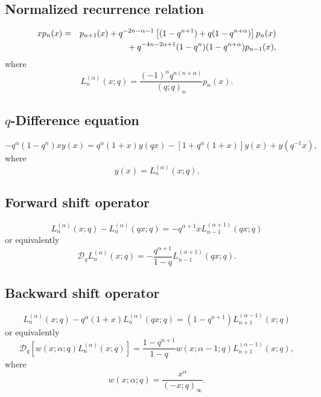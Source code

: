\documentclass[envcountchap,graybox]{svmono}
\newcommand{\mathindent}{\hspace{7.5mm}}
\begin{document}
{{\subsection*{Normalized recurrence relation}
\begin{eqnarray}
\label{NormRecqLaguerre}
xp_n(x)&=&p_{n+1}(x)+q^{-2n-\alpha-1}\left[(1-q^{n+1})+q(1-q^{n+\alpha})\right]p_n(x)\nonumber\\
& &{}\mathindent{}+q^{-4n-2\alpha+1}(1-q^n)(1-q^{n+\alpha})p_{n-1}(x),
\end{eqnarray}
where
$$L_n^{(\alpha)}(x;q)=\frac{(-1)^nq^{n(n+\alpha)}}{(q;q)_n}p_n(x).$$

\subsection*{$q$-Difference equation}
\begin{equation}
\label{dvqLaguerre}
-q^{\alpha}(1-q^n)xy(x)=q^{\alpha}(1+x)y(qx)-\left[1+q^{\alpha}(1+x)\right]y(x)+y(q^{-1}x),
\end{equation}
where
$$y(x)=L_n^{(\alpha)}(x;q).$$

\subsection*{Forward shift operator}
\begin{equation}
\label{shift1qLaguerreI}
L_n^{(\alpha)}(x;q)-L_n^{(\alpha)}(qx;q)=-q^{\alpha+1}xL_{n-1}^{(\alpha+1)}(qx;q)
\end{equation}
or equivalently
\begin{equation}
\label{shift1qLaguerreII}
\mathcal{D}_qL_n^{(\alpha)}(x;q)=-\frac{q^{\alpha+1}}{1-q}L_{n-1}^{(\alpha+1)}(qx;q).
\end{equation}

\subsection*{Backward shift operator}
\begin{equation}
\label{shift2qLaguerreI}
L_n^{(\alpha)}(x;q)-q^{\alpha}(1+x)L_n^{(\alpha)}(qx;q)=(1-q^{n+1})L_{n+1}^{(\alpha-1)}(x;q)
\end{equation}
or equivalently
\begin{equation}
\label{shift2qLaguerreII}
\mathcal{D}_q\left[w(x;\alpha;q)L_n^{(\alpha)}(x;q)\right]=
\frac{1-q^{n+1}}{1-q}w(x;\alpha-1;q)L_{n+1}^{(\alpha-1)}(x;q),
\end{equation}
where
$$w(x;\alpha;q)=\frac{x^{\alpha}}{(-x;q)_{\infty}}.$$

}}
\end{document}
